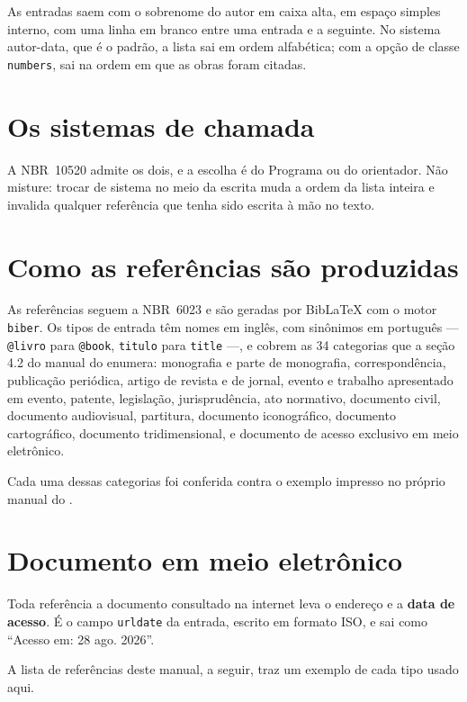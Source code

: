 \documentclass[dsc]{ufrj}
\begin{document}
  As entradas saem com o sobrenome do autor em caixa alta, em espaço simples
  interno, com uma linha em branco entre uma entrada e a seguinte. No sistema
  autor-data, que é o padrão, a lista sai em ordem alfabética; com a opção de
  classe \verb|numbers|, sai na ordem em que as obras foram citadas.

  \section{Os sistemas de chamada}

  A \mbox{NBR~10520} admite os dois, e a escolha é do Programa ou do orientador.
  Não misture: trocar de sistema no meio da escrita muda a ordem da lista inteira
  e invalida qualquer referência que tenha sido escrita à mão no texto.

  \section{Como as referências são produzidas}

  As referências seguem a \mbox{NBR~6023} e são geradas por BibLaTeX com o motor
  \texttt{biber}. Os tipos de entrada têm nomes em inglês, com sinônimos em
  português --- \verb|@livro| para \verb|@book|, \verb|titulo| para
  \verb|title| ---, e cobrem as 34 categorias que a seção 4.2 do manual do
   enumera: monografia e parte de monografia, correspondência,
  publicação periódica, artigo de revista e de jornal, evento e trabalho
  apresentado em evento, patente, legislação, jurisprudência, ato normativo,
  documento civil, documento audiovisual, partitura, documento iconográfico,
  documento cartográfico, documento tridimensional, e documento de acesso
  exclusivo em meio eletrônico.

  Cada uma dessas categorias foi conferida contra o exemplo impresso no próprio
  manual do .

  \section{Documento em meio eletrônico}

  Toda referência a documento consultado na internet leva o endereço e a
  \textbf{data de acesso}. É o campo \verb|urldate| da entrada, escrito em
  formato ISO, e sai como ``Acesso em: 28 ago. 2026''.

  A lista de referências deste manual, a seguir, traz um exemplo de cada tipo
  usado aqui.
\end{document}
